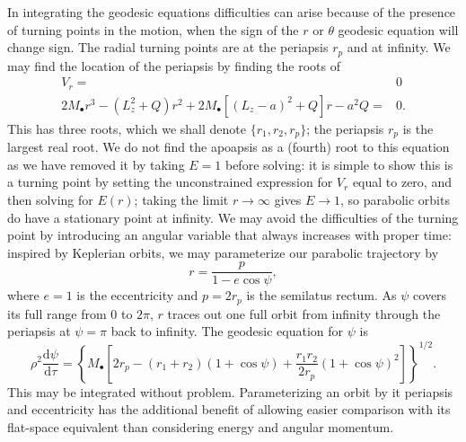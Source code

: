 \documentclass[a4paper, 11pt, titlepage, twoside]{report}
\newcommand{\dd}{\ensuremath{\mathrm{d}}}
\newcommand{\diff}[2]{\ensuremath{\frac{\dd {#1}}{\dd {#2}}}}
\begin{document}
In integrating the geodesic equations difficulties can arise because of the presence of turning points in the motion, when the sign of the $r$ or $\theta$ geodesic equation will change sign. The radial turning points are at the periapsis $r_p$ and at infinity. We may find the location of the periapsis by finding the roots of
\begin{align}
V_r = {} & 0 \nonumber \\
2M_\bullet r^3 - \left(L_z^2+Q\right)r^2 + 2M_\bullet\left[\left(L_z - a\right)^2 + Q\right]r - a^2Q= {} & 0.
\end{align}
This has three roots, which we shall denote $\{r_1, r_2, r_p\}$; the periapsis $r_p$ is the largest real root. We do not find the apoapsis as a (fourth) root to this equation as we have removed it by taking $E = 1$ before solving: it is simple to show this is a turning point by setting the unconstrained expression for $V_r$ equal to zero, and then solving for $E(r)$; taking the limit $r \rightarrow \infty$ gives $E \rightarrow 1$, so parabolic orbits do have a stationary point at infinity\cite{Wilkins1972}. We may avoid the difficulties of the turning point by introducing an angular variable that always increases with proper time\cite{Drasco2004}: inspired by Keplerian orbits, we may parameterize our parabolic trajectory by
\begin{equation}
r = \frac{p}{1-e\cos\psi},
\end{equation}
where $e = 1$ is the eccentricity and $p = 2r_p$ is the semilatus rectum. As $\psi$ covers its full range from $0$ to $2\pi$, $r$ traces out one full orbit from infinity through the periapsis at $\psi = \pi$ back to infinity. The geodesic equation for $\psi$ is
\begin{equation}
\rho^2 \diff{\psi}{\tau} = \left\{M_\bullet\left[2r_p - \left(r_1 + r_2\right)\left(1 + \cos\psi\right) + \frac{r_1 r_2}{2r_p}\left(1 + \cos\psi\right)^2\right]\right\}^{1/2}.
\end{equation}
This may be integrated without problem. Parameterizing an orbit by it periapsis and eccentricity has the additional benefit of allowing easier comparison with its flat-space equivalent than considering energy and angular momentum\cite{Gair2005}.
\end{document}
